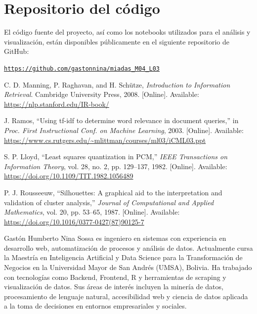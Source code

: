 \documentclass[journal]{IEEEtran}
\begin{document}
\section*{Repositorio del código}

El código fuente del proyecto, así como los notebooks utilizados para el análisis y visualización, están disponibles públicamente en el siguiente repositorio de GitHub:

\noindent\texttt{\url{https://github.com/gastonnina/miadas_M04_L03}}



\begin{thebibliography}{9}

C. D. Manning, P. Raghavan, and H. Schütze, \textit{Introduction to Information Retrieval}. Cambridge University Press, 2008. [Online]. Available: \url{https://nlp.stanford.edu/IR-book/}

J. Ramos, “Using tf-idf to determine word relevance in document queries,” in \textit{Proc. First Instructional Conf. on Machine Learning}, 2003. [Online]. Available: \url{https://www.cs.rutgers.edu/~mlittman/courses/ml03/iCML03.ppt}

S. P. Lloyd, “Least squares quantization in PCM,” \textit{IEEE Transactions on Information Theory}, vol. 28, no. 2, pp. 129–137, 1982. [Online]. Available: \url{https://doi.org/10.1109/TIT.1982.1056489}

P. J. Rousseeuw, “Silhouettes: A graphical aid to the interpretation and validation of cluster analysis,” \textit{Journal of Computational and Applied Mathematics}, vol. 20, pp. 53–65, 1987. [Online]. Available: \url{https://doi.org/10.1016/0377-0427(87)90125-7}

\end{thebibliography}

\begin{IEEEbiography}{Gastón Humberto Nina Sossa}
es ingeniero en sistemas con experiencia en desarrollo web, automatización de procesos y análisis de datos. Actualmente cursa la Maestría en Inteligencia Artificial y Data Science para la Transformación de Negocios en la Universidad Mayor de San Andrés (UMSA), Bolivia. Ha trabajado con tecnologías como Backend, Frontend, R y herramientas de scraping y visualización de datos. Sus áreas de interés incluyen la minería de datos, procesamiento de lenguaje natural, accesibilidad web y ciencia de datos aplicada a la toma de decisiones en entornos empresariales y sociales.
\end{IEEEbiography}
\end{document}
